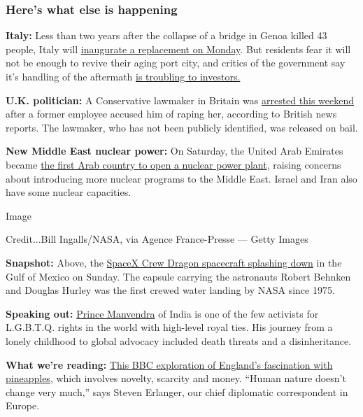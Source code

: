 \hypertarget{heres-what-else-is-happening}{%
\subsubsection{Here's what else is
happening}\label{heres-what-else-is-happening}}

\textbf{Italy:} Less than two years after the collapse of a bridge in
Genoa killed 43 people, Italy will
\href{https://www.nytimes.com/2020/08/02/world/europe/genoa-Morandi-bridge-replacement.html}{inaugurate
a replacement on Monday}. But residents fear it will not be enough to
revive their aging port city, and critics of the government say it's
handling of the aftermath
\href{https://www.nytimes.com/2020/08/01/world/europe/italy-genoa-bridge-collapse-benettons.html}{is
troubling to investors.}

\textbf{U.K. politician:} A Conservative lawmaker in Britain was
\href{https://www.nytimes.com/2020/08/02/world/europe/uk-conservative-lawmaker-arrest.html}{arrested
this weekend} after a former employee accused him of raping her,
according to British news reports. The lawmaker, who has not been
publicly identified, was released on bail.

\textbf{New Middle East nuclear power:} On Saturday, the United Arab
Emirates became
\href{https://www.nytimes.com/2020/08/01/world/middleeast/uae-nuclear-Barakah.html}{the
first Arab country to open a nuclear power plant}, raising concerns
about introducing more nuclear programs to the Middle East. Israel and
Iran also have some nuclear capacities.

Image

Credit...Bill Ingalls/NASA, via Agence France-Presse --- Getty Images

\textbf{Snapshot:} Above, the
\href{https://www.nytimes.com/2020/08/02/science/spacex-nasa-return.html?action=click\&module=Top\%20Stories\&pgtype=Homepage}{SpaceX
Crew Dragon spacecraft splashing down} in the Gulf of Mexico on Sunday.
The capsule carrying the astronauts Robert Behnken and Douglas Hurley
was the first crewed water landing by NASA since 1975.

\textbf{Speaking out:}
\href{https://www.nytimes.com/2020/07/31/world/asia/india-prince-manvendra-gay-rights.html}{Prince
Manvendra} of India is one of the few activists for L.G.B.T.Q. rights in
the world with high-level royal ties. His journey from a lonely
childhood to global advocacy included death threats and a
disinheritance.

\textbf{What we're reading:}
\href{https://www.bbc.com/news/uk-england-53432877}{This BBC exploration
of England's fascination with pineapples}, which involves novelty,
scarcity and money. ``Human nature doesn't change very much,'' says
Steven Erlanger, our chief diplomatic correspondent in Europe.

